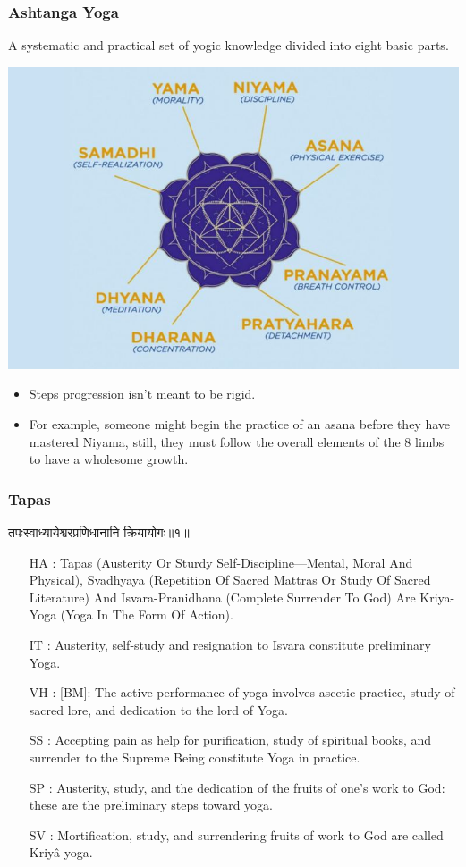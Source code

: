 \begin{frame}[fragile]\frametitle{Ashtanga  Yoga}

A systematic and practical set of yogic knowledge divided into eight basic parts.

\begin{center}
\includegraphics[width=0.6\linewidth,keepaspectratio]{images/yog22}
\end{center}

		\begin{itemize}
		\item Steps progression isn’t meant to be rigid. 
		\item For example, someone might begin the practice of an asana before they have mastered Niyama, still, they must follow the overall elements of the 8 limbs to have a wholesome growth.
		\end{itemize}
		
\end{frame}


\begin{frame}[fragile]\frametitle{Tapas}
\begin{sanskrit}
तपःस्वाध्यायेश्वरप्रणिधानानि क्रियायोगः॥१॥
\end{sanskrit}

	\begin{itemize}
	\item [HA]: Tapas (Austerity Or Sturdy Self-Discipline—Mental, Moral And Physical), Svadhyaya (Repetition Of Sacred Mattras Or Study Of Sacred Literature) And Isvara-Pranidhana (Complete Surrender To God) Are Kriya-Yoga (Yoga In The Form Of Action).
	\item [IT]: Austerity, self-study and resignation to Isvara constitute preliminary Yoga.
	\item [VH]: [BM]: The active performance of yoga involves ascetic practice, study of sacred lore, and dedication to the lord of Yoga.
	\item [SS]: Accepting pain as help for purification, study of spiritual books, and surrender to the Supreme Being constitute Yoga in practice.
	\item [SP]: Austerity, study, and the dedication of the fruits of one’s work to God: these are the preliminary steps toward yoga.
	\item [SV]: Mortification, study, and surrendering fruits of work to God are called Kriyâ-yoga. 
	\end{itemize}
\end{frame}


